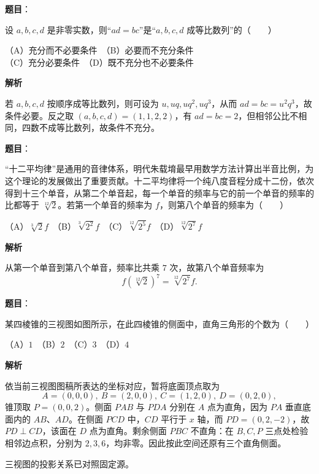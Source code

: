 \begin{answer}

\textbf{题目}：

设 $a,b,c,d$ 是非零实数，则“$ad=bc$”是“$a,b,c,d$ 成等比数列”的\mbox{（　　）}

（A）充分而不必要条件　（B）必要而不充分条件\\
（C）充分必要条件　（D）既不充分也不必要条件

\textbf{解析}

若 $a,b,c,d$ 按顺序成等比数列，则可设为 $u,uq,uq^2,uq^3$，从而 $ad=bc=u^2q^3$，故条件必要。反之取 $(a,b,c,d)=(1,1,2,2)$，有 $ad=bc=2$，但相邻公比不相同，四数不成等比数列，故条件不充分。


\end{answer}
\begin{answer}

\textbf{题目}：

“十二平均律”是通用的音律体系，明代朱载堉最早用数学方法计算出半音比例，为这个理论的发展做出了重要贡献。十二平均律将一个纯八度音程分成十二份，依次得到十三个单音，从第二个单音起，每一个单音的频率与它的前一个单音的频率的比都等于 $\sqrt[12]{2}$。若第一个单音的频率为 $f$，则第八个单音的频率为\mbox{（　　）}

（A）$\sqrt[3]{2}f$　（B）$\sqrt[3]{2^2}f$　（C）$\sqrt[12]{2^5}f$　（D）$\sqrt[12]{2^7}f$

\textbf{解析}

从第一个单音到第八个单音，频率比共乘 $7$ 次，故第八个单音频率为
\nopagebreak[4]
\[
f\left(\sqrt[12]2\right)^7=\sqrt[12]{2^7}f.
\]


\end{answer}
\begin{answer}

\textbf{题目}：

某四棱锥的三视图如图所示，在此四棱锥的侧面中，直角三角形的个数为\mbox{（　　）}
\nopagebreak[4]
\begin{center}\end{center}
\nopagebreak[4]
（A）$1$　（B）$2$　（C）$3$　（D）$4$

\textbf{解析}

依当前三视图图稿所表达的坐标对应，暂将底面顶点取为
\nopagebreak[4]
\[
A=(0,0,0),\ B=(2,0,0),\ C=(1,2,0),\ D=(0,2,0),
\]
锥顶取 $P=(0,0,2)$。侧面 $PAB$ 与 $PDA$ 分别在 $A$ 点为直角，因为 $PA$ 垂直底面内的 $AB$、$AD$。在侧面 $PCD$ 中，$CD$ 平行于 $x$ 轴，而 $PD=(0,2,-2)$，故 $PD\perp CD$，该面在 $D$ 点为直角。剩余侧面 $PBC$ 不直角：在 $B,C,P$ 三点处检验相邻边点积，分别为 $2,3,6$，均非零。因此按此空间还原有三个直角侧面。

三视图的投影关系已对照固定源。


\end{answer}
